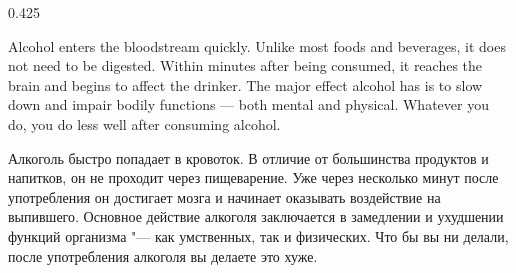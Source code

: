 


\begin{langblock}{0.425}
	\begin{eng}
	
	Alcohol enters the bloodstream quickly. Unlike most foods and beverages, it does not need to be digested. Within minutes after being consumed, it reaches the brain and begins to affect the drinker. The major effect alcohol has is to slow down and impair bodily functions --- both mental and physical. Whatever you do, you do less well after consuming alcohol.
	\end{eng}
	\begin{rus}
		
		Алкоголь быстро попадает в кровоток. В отличие от большинства продуктов и напитков, он не проходит через пищеварение. Уже через несколько минут после употребления он достигает мозга и начинает оказывать воздействие на выпившего. Основное действие алкоголя заключается в замедлении и ухудшении функций организма "--- как умственных, так и физических. Что бы вы ни делали, после употребления алкоголя вы делаете это хуже.
\end{rus}
\end{langblock}





